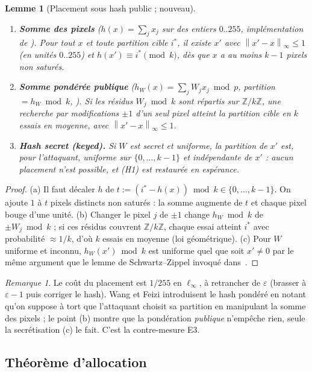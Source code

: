 \documentclass[11pt,a4paper]{article}
\theoremstyle{plain}
\newtheorem{lemma}[theorem]{Lemme}
\theoremstyle{definition}
\theoremstyle{remark}
\newtheorem{remark}[theorem]{Remarque}
\newcommand{\norm}[1]{\left\lVert #1 \right\rVert}
\begin{document}
\begin{lemma}[Placement sous hash public ; nouveau]\label{lem:hash}
\begin{enumerate}[label=(\alph*)]
\item \textbf{Somme des pixels} ($h(x)=\sum_j x_j$ sur des entiers $0..255$, implémentation de
\cite{levine2021}). Pour tout $x$ et toute partition cible $i^*$, il existe $x'$ avec
$\norm{x'-x}_\infty\le1$ (en unités $0..255$) et $h(x')\equiv i^*\pmod k$, dès que $x$ a au moins
$k-1$ pixels non saturés.
\item \textbf{Somme pondérée publique} ($h_W(x)=\sum_jW_jx_j\bmod p$, partition $=h_W\bmod k$,
\cite[Déf.~4.1]{wang2023}). Si les résidus $W_j\bmod k$ sont répartis sur $\mathbb Z/k\mathbb Z$,
une recherche par modifications $\pm1$ d'un seul pixel atteint la partition cible en $k$ essais
en moyenne, avec $\norm{x'-x}_\infty\le1$.
\item \textbf{Hash secret (keyed).} Si $W$ est secret et uniforme, la partition de $x'$ est, pour
l'attaquant, uniforme sur $\{0,\dots,k-1\}$ et indépendante de $x'$ : aucun placement n'est
possible, et (H1) est restaurée en espérance.
\end{enumerate}
\end{lemma}
\begin{proof}
(a) Il faut décaler $h$ de $t:=(i^*-h(x))\bmod k\in\{0,\dots,k-1\}$. On ajoute $1$ à $t$ pixels
distincts non saturés : la somme augmente de $t$ et chaque pixel bouge d'une unité. (b) Changer
le pixel $j$ de $\pm1$ change $h_W\bmod k$ de $\pm W_j\bmod k$ ; si ces résidus couvrent
$\mathbb Z/k\mathbb Z$, chaque essai atteint $i^*$ avec probabilité $\approx1/k$, d'où $k$ essais
en moyenne (loi géométrique). (c) Pour $W$ uniforme et inconnu, $h_W(x')\bmod k$ est uniforme
quel que soit $x'\neq0$ par le même argument que le lemme de Schwartz--Zippel invoqué
dans~\cite{wang2023}.
\end{proof}

\begin{remark}
Le coût du placement est $1/255$ en $\ell_\infty$, à retrancher de $\varepsilon$ (brasser à
$\varepsilon-1$ puis corriger le hash). Wang et Feizi introduisent le hash pondéré en notant qu'on
\og{}suppose à tort\fg{} que l'attaquant choisit sa partition en manipulant la somme des pixels ;
le point (b) montre que la pondération \emph{publique} n'empêche rien, seule la secrétisation (c)
le fait. C'est la contre-mesure E3.
\end{remark}

\subsection{Théorème d'allocation}
\end{document}
